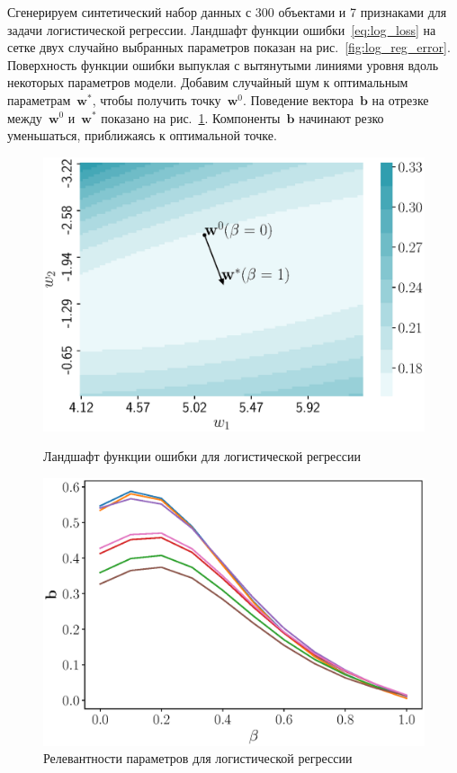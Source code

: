 \documentclass[a4paper,12pt]{article}
\theoremstyle{plain} %
\theoremstyle{definition} %
\theoremstyle{remark} %
\newcommand{\bb}{\mathbf{b}}
\newcommand{\bw}{\mathbf{w}}
\begin{document}
	Сгенерируем синтетический набор данных с 300 объектами и 7 признаками для задачи логистической регрессии. 
	Ландшафт функции ошибки~\eqref{eq:log_loss} на сетке двух случайно выбранных параметров показан на рис.~\ref{fig:log_reg_error}.
	Поверхность функции ошибки выпуклая с вытянутыми линиями уровня вдоль некоторых параметров модели.
	Добавим случайный шум к оптимальным параметрам~$\bw^*$, чтобы получить точку~$\bw^0$. Поведение вектора~$\bb$ на отрезке между~$\bw^0$ и~$\bw^*$ показано на рис.~\ref{fig:log_reg_b_wrt_beta}.
	Компоненты~$\bb$ начинают резко уменьшаться, приближаясь к оптимальной точке.
	\begin{figure}
		\centering
		\begin{minipage}{.47\textwidth}
			\centering
			\includegraphics[width=\linewidth]{figs/log_reg_error}
			\caption{Ландшафт функции ошибки для логистической регрессии}
			\label{fig:log_reg_error}
		\end{minipage}%
		\begin{minipage}{.47\textwidth}
			\centering
			\includegraphics[width=\linewidth]{figs/log_reg_b_wrt_beta}
			\caption{Релевантности параметров для логистической регрессии}
			\label{fig:log_reg_b_wrt_beta}
		\end{minipage}
	\end{figure}
\end{document}
